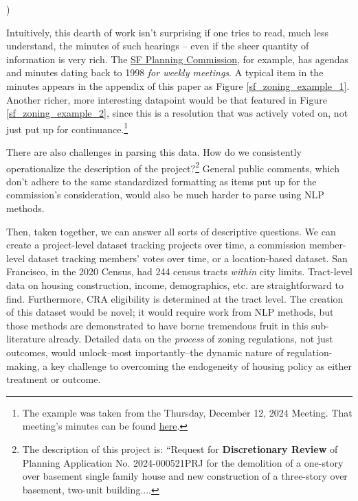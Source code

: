 )\documentclass{article}[11pt]
\begin{document}
Intuitively, this dearth of work isn't surprising if one tries to read, much less understand, the minutes of such hearings -- even if the sheer quantity of information is very rich. The \href{https://sfplanning.org/cpc-hearing-archives}{SF Planning Commission}, for example, has agendas and minutes dating back to 1998 \textit{for weekly meetings}. A typical item in the minutes appears in the appendix of this paper as Figure \ref{sf_zoning_example_1}. Another richer, more interesting datapoint would be that featured in Figure \ref{sf_zoning_example_2}, since this is a resolution that was actively voted on, not just put up for continuance.\footnote{The example was taken from the Thursday, December 12, 2024 Meeting. That meeting's minutes can be found \href{https://citypln-m-extnl.sfgov.org/Commissions/Agenda_or_Minutes/20241212_cpc_min.pdf}{here}.}



There are also challenges in parsing this data. How do we consistently operationalize the description of the project?\footnote{The description of this project is: ``Request for \textbf{Discretionary Review} of Planning Application No. 2024-000521PRJ for the demolition of a one-story over basement single family house and new construction of a three-story over basement, two-unit building....} General public comments, which don't adhere to the same standardized formatting as items put up for the commission's consideration, would also be much harder to parse using NLP methods.

Then, taken together, we can answer all sorts of descriptive questions. We can create a project-level dataset tracking projects over time, a commission member-level dataset tracking members' votes over time, or a location-based dataset. San Francisco, in the 2020 Census, had 244 census tracts \textit{within} city limits. Tract-level data on housing construction, income, demographics, etc. are straightforward to find. Furthermore, CRA eligibility is determined at the tract level. The creation of this dataset would be novel; it would require work from NLP methods, but those methods are demonstrated to have borne tremendous fruit in this sub-literature already. Detailed data on the \textit{process} of zoning regulations, not just outcomes, would unlock--most importantly--the dynamic nature of regulation-making, a key challenge to overcoming the endogeneity of housing policy as either treatment or outcome.
\end{document}
